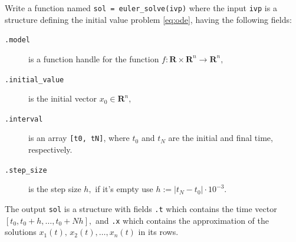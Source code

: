 \documentclass[a4paper, fleqn, 10pt]{report}
\theoremstyle{definition}
\newcommand{\R}{\mathbf{R}}
\newcommand{\mc}[1]{{\color{Blue}\tt #1}}
\newcommand{\mck}[1]{{\tt#1}}
\begin{document}
Write a function named \mck{sol = }\mc{euler\_solve}\mck{(ivp)}
where the input \mck{ivp} is a structure defining the initial value problem \eqref{eq:ode},
having the following fields:
\begin{description}
 \item[\mck{.model}] is a function handle for the function $f\colon \R\times\R^n\to\R^n,$
 \item[\mck{.initial\_value}] is the initial vector $x_0\in\R^n,$
 \item[\mck{.interval}] is an array \mck{[t0, tN]}, where $t_0$ and $t_N$ are the initial and final time, respectively.
 \item[\mck{.step\_size}] is the step size $h,$ if it's empty use $h:=|t_N-t_0|\cdot 10^{-3}.$
\end{description}
The output \mck{sol} is a structure with fields \mck{.t} which contains the time vector $[t_0,t_0+h,\dots,t_0+Nh],$
and \mck{.x} which contains the approximation of the solutions $x_1(t),\,x_2(t),\dots,x_n(t)$ in its rows.
\end{document}
